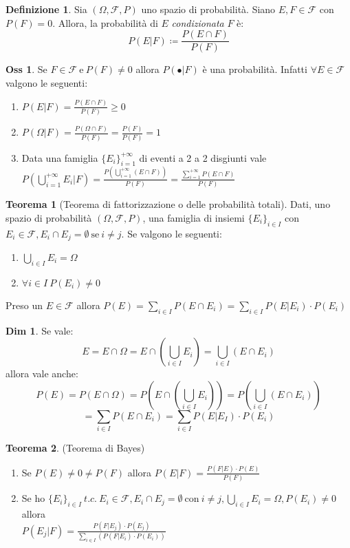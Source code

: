 \documentclass[12pt, a4paper]{report}
\theoremstyle{definition}
\newtheorem{definition}{Definizione}[section]
\newtheorem{theorem}{Teorema}[section]
\newtheorem*{demonstration}{Dim}
\newtheorem*{observation}{Oss}
\DeclareRobustCommand{\F}{\mathcal{F}}%
\DeclareRobustCommand{\probspace}{(\Omega,\F,P)}
\DeclareRobustCommand{\partitionInI}{\{E_i\}_{i\in I}}
\begin{document}
\begin{definition}
	Sia $\probspace$ uno spazio di probabilità. Siano \(E,F\in\F\) con $P(F)=0$.
	Allora, la probabilità di $E$ \emph{condizionata} $F$ è:
	\[P(E|F)\coloneqq\frac{P(E\cap F)}{P(F)}\]
\end{definition}
\begin{observation}
	Se \(F\in\F\ \text{e}\ P(F)\neq0\) allora \(P(\bullet | F)\) è una probabilità.
	Infatti \(\forall E\in\F\) valgono le seguenti:
	\begin{enumerate}[label=(\roman*)]
		\item \(P(E|F)=\frac{P(E\cap F)}{P(F)}\geq0\)
		\item \(P(\Omega|F)=\frac{P(\Omega\cap F)}{P(F)}=\frac{P(F)}{P(F)}=1\)
		\item Data una famiglia \(\{E_i\}_{i=1}^{+\infty}\) di eventi a 2 a 2
		disgiunti vale \(P(\bigcup_{i=1}^{+\infty}E_i|F)=\frac{P(\bigcup_{i=1}^
		{+\infty}(E\cap F))}{P(F)}=\frac{\sum_{i=1}^{+\infty}P(E\cap F)}{P(F)}\)
	\end{enumerate}
\end{observation}
\newpage
\begin{theorem}[Teorema di fattorizzazione o delle probabilità totali]
	Dati, uno spazio di probabilità $\probspace$, una famiglia di insiemi
	$\partitionInI$ con \(E_i\in\F, E_i\cap E_j=\emptyset\ \text{se}\ i\neq j\).
	Se valgono le seguenti:
	\begin{enumerate}[label=(\roman*)]
		\item \(\bigcup_{i\in I}E_i=\Omega\)
		\item \(\forall i\in I\ P(E_i)\neq 0\)
	\end{enumerate}
	Preso un \(E\in\F\) allora \(P(E)=\sum_{i\in I}P(E\cap E_i)=\sum_{i\in I}
	P(E|E_i)\cdot P(E_i)\)
\end{theorem}
\begin{demonstration}
	Se vale:
	\[E=E\cap\Omega =E\cap\left(\bigcup_{i\in I}E_i\right)=\bigcup_{i\in I}
	(E\cap E_i)\]
	allora vale anche:
	\[P(E)=P\left(E\cap\Omega\right)=P\left(E\cap \left(\bigcup_{i\in I}E_i\right)
	\right)=P\left(\bigcup_{i\in I}\left(E\cap E_i\right)\right)\]
	\[=\sum_{i\in I}P(E\cap E_i)=\sum_{i\in I}P(E|E_I)\cdot P(E_i)\]
\end{demonstration}
\begin{theorem}(Teorema di Bayes)
	\begin{enumerate}[label=(\roman*)]
		\item Se \(P(E)\neq 0 \neq P(F)\) allora \(P(E|F)=
		\frac{P(F|E)\cdot P(E)}{P(F)}\)
		\item Se ho \(\partitionInI\ t.c.\ E_i\in\F, E_i\cap E_j=\emptyset\ 
		\text{con}\ i\neq j, \bigcup_{i\in I}E_i=\Omega, P(E_i)\neq 0\) allora
		\\\(P(E_j|F)=\frac{P(F|E_j)\cdot P(E_j)}{\sum_{i\in I}(P(F|E_i)\cdot P(E_i))}\)
	\end{enumerate}
\end{theorem}
\end{document}
